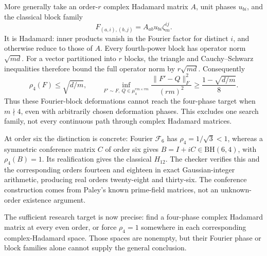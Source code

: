 More generally take an order-$r$ complex Hadamard matrix $A$,
unit phases $u_{bi}$, and the classical block family
\[
 F_{(a,i),(b,j)}=A_{ab}u_{bi}\zeta_m^{ij}.
\]
It is Hadamard: inner products vanish in the Fourier factor for
distinct $i$, and otherwise reduce to those of $A$.
Every fourth-power block has operator norm $\sqrt{md}$.
For a vector partitioned into $r$ blocks, the triangle and
Cauchy--Schwarz inequalities therefore bound the full operator norm
by $r\sqrt{md}$. Consequently
\[
 \rho_4(F)\le\sqrt{d/m},\qquad
 \inf_{F'\sim F,\ Q\in\mu_4^{rm\times rm}}
 \frac{\|F'-Q\|_F^2}{(rm)^2}
 \ge\frac{1-\sqrt{d/m}}8.
\]
Thus these Fourier-block deformations cannot reach the four-phase
target when $m\nmid4$, even with arbitrarily chosen deformation phases.
This excludes one search family, not every continuous path through
complex Hadamard matrices.

At order six the distinction is concrete: Fourier $\mathcal F_6$
has $\rho_4=1/\sqrt3<1$, whereas a symmetric conference matrix $C$
of order six gives $B=I+iC\in\mathrm{BH}(6,4)$, with $\rho_4(B)=1$.
Its realification gives the classical $H_{12}$. The checker verifies
this and the corresponding orders fourteen and eighteen in exact
Gaussian-integer arithmetic, producing real orders twenty-eight
and thirty-six. The conference construction comes from Paley's
known prime-field matrices, not an unknown-order existence argument.

The sufficient research target is now precise: find a four-phase
complex Hadamard matrix at every even order, or force $\rho_4=1$
somewhere in each corresponding complex-Hadamard space.
Those spaces are nonempty, but their Fourier phase or block
families alone cannot supply the general conclusion.
